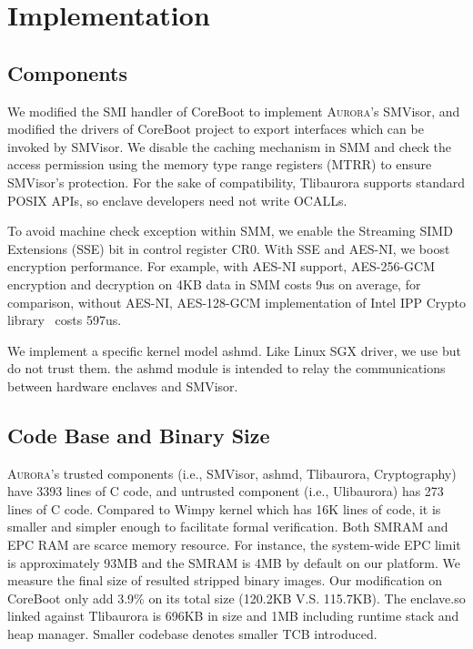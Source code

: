 \section{Implementation}

\subsection{Components}

We modified the SMI handler of CoreBoot to implement \textsc{Aurora}'s SMVisor, and modified the drivers of CoreBoot project to export interfaces which can be invoked by SMVisor. We disable the caching mechanism in SMM and check the access permission using the memory type range registers (MTRR) to ensure SMVisor's protection. For the sake of compatibility, Tlibaurora supports standard
POSIX APIs, so enclave developers need not write OCALLs.

To avoid machine check exception within SMM, we enable the Streaming SIMD Extensions (SSE) bit in control register CR0. With SSE and AES-NI, we boost encryption performance. For example, with AES-NI support, AES-256-GCM encryption and decryption on 4KB data in SMM costs 9us on average, for comparison,  without AES-NI, AES-128-GCM implementation of Intel IPP Crypto library~\cite{Intel_IPP_2017_Update_2} costs 597us.

We implement a specific kernel model ashmd. Like Linux SGX driver, we use but do not trust them. the ashmd module is intended to relay the communications between hardware enclaves and SMVisor.

\subsection{Code Base and Binary Size}\label{codebase}
\textsc{Aurora}'s trusted components (i.e., SMVisor, ashmd, Tlibaurora, Cryptography) have 3393 lines of C code, and untrusted component (i.e., Ulibaurora) has 273 lines of C code. Compared to Wimpy kernel \cite{zhou_dancing_2014} which has 16K lines of code, it is smaller and simpler enough to facilitate formal verification.
Both SMRAM and EPC RAM are scarce memory resource. For instance, the system-wide EPC limit is approximately 93MB and the SMRAM is 4MB by default on our platform. We measure the final size of resulted stripped binary images. Our modification on CoreBoot only add 3.9\% on its total size (120.2KB V.S. 115.7KB). The enclave.so  linked against Tlibaurora is 696KB in size and 1MB including runtime stack and heap manager. Smaller codebase denotes smaller TCB introduced.

